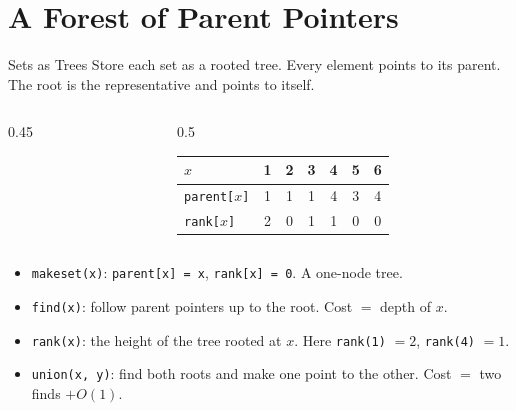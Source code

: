 \documentclass[10pt,aspectratio=169]{beamer}
\newcommand{\uftab}[2]{%
  \begin{tabular}{l|cccccc}
    $x$ & 1 & 2 & 3 & 4 & 5 & 6 \\ \hline
    \texttt{parent[$x$]} & #1 \\
    \texttt{rank[$x$]} & #2 \\
  \end{tabular}%
}
\begin{document}
\section{A Forest of Parent Pointers}

\begin{frame}{Sets as Trees}
  Store each set as a rooted tree. Every element points to its
  \alert{parent}. The root is the representative and points to itself.

  \medskip
  \begin{columns}[c]
    \begin{column}{0.45\textwidth}
      \begin{center}
      \end{center}
    \end{column}
    \begin{column}{0.5\textwidth}
      \begin{center}
      \uftab{1 & 1 & 1 & 4 & 3 & 4}{2 & 0 & 1 & 1 & 0 & 0}
      \end{center}
    \end{column}
  \end{columns}

  \begin{itemize}
    \item \texttt{makeset(x)}: \texttt{parent[x] = x}, \texttt{rank[x] = 0}.
          A one-node tree.
    \item \texttt{find(x)}: follow parent pointers up to the root.
          Cost $=$ depth of $x$.
    \item \texttt{rank(x)}: the \alert{height} of the tree rooted at $x$.
          Here \texttt{rank(1)} $= 2$, \texttt{rank(4)} $= 1$.
    \item \texttt{union(x, y)}: find both roots and make one point to the
          other. Cost $=$ two finds $+ O(1)$.
  \end{itemize}
\end{frame}
\end{document}
